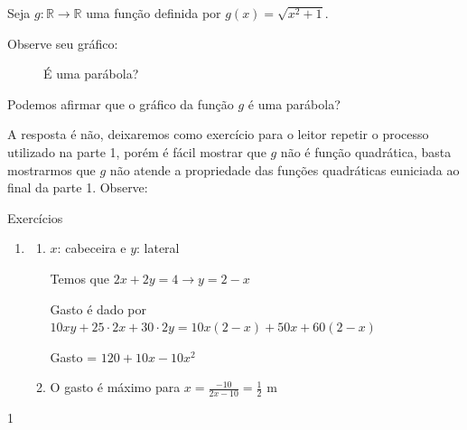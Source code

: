 Seja \(g:\mathbb{R}\to\mathbb{R}\) uma função definida por \(g(x)=\sqrt{x^2+1}\).

Observe seu gráfico:
\begin{figure}[H]
\centering

\caption{É uma parábola?}
\end{figure}

Podemos afirmar que o gráfico da função \(g\) é uma parábola?

A resposta é não, deixaremos como exercício para o leitor repetir o processo utilizado na parte 1, porém é fácil mostrar que \(g\) não é função quadrática, basta mostrarmos que \(g\) não atende a propriedade das funções quadráticas euniciada ao final da parte 1. Observe:
\clearpage
\def\currentcolor{cor1}
\begin{answer}{Exercícios}
{\exerciselist
\begin{enumerate}
\item 
\begin{enumerate}
\item {} 
\(x\): cabeceira  e  \(y\): lateral

Temos que \(2x + 2y = 4 \to y = 2 - x\)

Gasto é dado por \(10xy + 25 \cdot 2x + 30 \cdot 2y = 10x(2 - x) +50x +60(2 - x)\)

Gasto = \(120 +10x - 10x^2\)

\item {} 
O gasto é máximo para \(x=\frac{-10}{2x-10}=\frac{1}{2}\) m
\end{enumerate}
\end{enumerate}
}{1}
\end{answer}
\def\currentcolor{session3}

